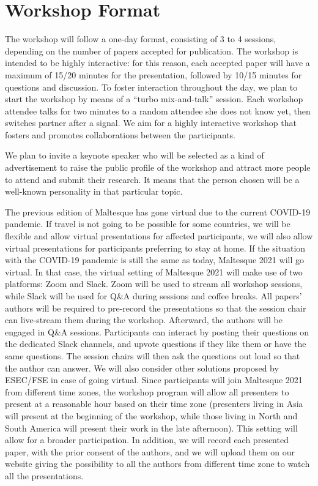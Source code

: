 
\section{Workshop Format}
\label{sec:format}

The workshop will follow a one-day format, consisting of 3 to 4 sessions, depending on the number of papers accepted for publication.
The workshop is intended to be highly interactive: for this reason, each accepted paper will have a maximum of 15/20 minutes for the presentation, followed by 10/15 minutes for questions and discussion.
To foster interaction throughout the day, we plan to start the workshop by means of a “turbo mix-and-talk” session. Each workshop attendee talks for two minutes to a random attendee she does not know yet, then switches partner after a signal. We aim for a highly interactive workshop that fosters and promotes collaborations between the participants. %

We plan to invite a keynote speaker who will be selected as a kind of advertisement to raise the public profile of the workshop and attract more people to attend and submit their research. It means that the person chosen will be a well-known personality in that particular topic. 

The previous edition of Maltesque has gone virtual due to the current COVID-19 pandemic. If travel is not going to be possible for some countries, we will be flexible and allow virtual presentations for affected participants, we will also allow virtual presentations for participants preferring to stay at home. If the situation with the COVID-19 pandemic is still the same as today, Maltesque 2021 will go virtual. In that case, the virtual setting of Maltesque 2021 will make use of two platforms: Zoom and Slack. Zoom will be used to stream all workshop sessions, while Slack will be used for Q\&A during sessions and coffee breaks. All papers' authors will be required to pre-record the presentations so that the session chair can live-stream them during the workshop. Afterward, the authors will be engaged in Q\&A sessions. Participants can interact by posting their questions on the dedicated Slack channels, and upvote questions if they like them or have the same questions. The session chairs will then ask the questions out loud so that the author can answer. We will also consider other solutions proposed by ESEC/FSE in case of going virtual.
Since participants will join Maltesque 2021 from different time zones, the workshop program will allow all presenters to present at a reasonable hour based on their time zone (\ie presenters living in Asia will present at the beginning of the workshop, while those living in North and South America will present their work in the late afternoon). This setting will allow for a broader participation. In addition, we will record each presented paper, with the prior consent of the authors, and we will upload them on our website giving the possibility to all the authors from different time zone to watch all the presentations.